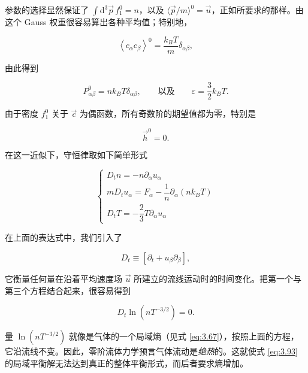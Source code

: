 参数的选择显然保证了 $\int \mathrm{d}^3\vec p\,f_1^0=n$，以及 $\langle\vec p/m\rangle^0=\vec u$，正如所要求的那样。由这个 Gauss 权重很容易算出各种平均值；特别地，

\begin{equation}\label{eq:3.94}
  \left\langle c_\alpha c_\beta\right\rangle^0=\frac{k_BT}{m}\delta_{\alpha\beta},
\end{equation}

由此得到

\begin{equation}\label{eq:3.95}
  P_{\alpha\beta}^0=nk_BT\delta_{\alpha\beta},\qquad\text{以及}\qquad\varepsilon=\frac{3}{2}k_BT.
\end{equation}

由于密度 $f_1^0$ 关于 $\vec c$ 为偶函数，所有奇数阶的期望值都为零，特别是

\begin{equation}\label{eq:3.96}
  \vec h^0=0.
\end{equation}

在这一近似下，守恒律取如下简单形式

\begin{equation}\label{eq:3.97}
  \begin{cases}
    D_tn=-n\partial_\alpha u_\alpha\\[4pt]
    mD_tu_\alpha=F_\alpha-\dfrac{1}{n}\partial_\alpha\left(nk_BT\right)\\[4pt]
    D_tT=-\dfrac{2}{3}T\partial_\alpha u_\alpha
  \end{cases}
\end{equation}

在上面的表达式中，我们引入了

\begin{equation}\label{eq:3.98}
  D_t\equiv\left[\partial_t+u_\beta\partial_\beta\right],
\end{equation}

它衡量任何量在沿着平均速度场 $\vec u$ 所建立的流线运动时的时间变化。把第一个与第三个方程结合起来，很容易得到

\begin{equation}\label{eq:3.99}
  D_t\ln\left(nT^{-3/2}\right)=0.
\end{equation}

量 $\ln\left(nT^{-3/2}\right)$ 就像是气体的一个局域熵（见式 \eqref{eq:3.67}），按照上面的方程，它沿流线不变。因此，零阶流体力学预言气体流动是\emph{绝热}的。这就使式 \eqref{eq:3.93} 的局域平衡解无法达到真正的整体平衡形式，而后者要求熵增加。

